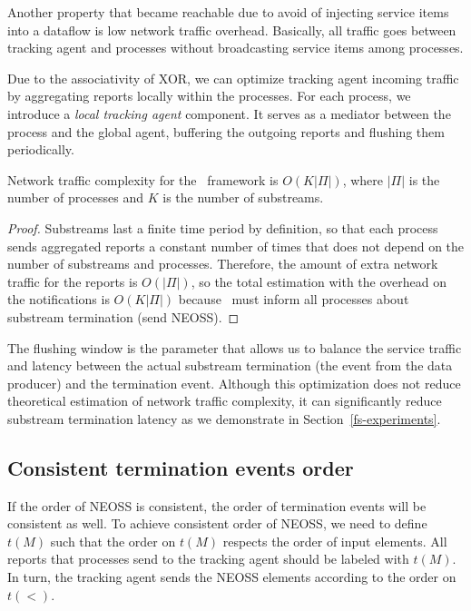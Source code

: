 Another property that became reachable due to avoid of injecting service items into a dataflow is low network traffic overhead. Basically, all traffic goes between tracking agent and processes without broadcasting service items among processes.

Due to the associativity of XOR, we can optimize tracking agent incoming traffic by aggregating reports locally within the processes. For each process, we introduce a {\em local tracking agent} component. It serves as a mediator between the process and the global agent, buffering the outgoing reports and flushing them periodically. 

\begin{lemma}
Network traffic complexity for the \tracker\ framework is $O(K|\Pi|)$, where $|\Pi|$ is the number of processes and $K$ is the number of substreams.
\end{lemma}
\begin{proof}
Substreams last a finite time period by definition, so that each process sends aggregated reports a constant number of times that does not depend on the number of substreams and processes. Therefore, the amount of extra network traffic for the reports is $O(|\Pi|)$, so the total estimation with the overhead on the notifications is $O(K|\Pi|)$ because \tracker\ must inform all processes about substream termination (send NEOSS).
\end{proof}

The flushing window is the parameter that allows us to balance the service traffic and latency between the actual substream termination (the event from the data producer) and the termination event. Although this optimization does not reduce theoretical estimation of network traffic complexity, it can significantly reduce substream termination latency as we demonstrate in Section~\ref{fs-experiments}.

\subsection{Consistent termination events order}

If the order of NEOSS is consistent, the order of termination events will be consistent as well. To achieve consistent order of NEOSS, we need to define $t(M)$ such that the order on $t(M)$ respects the order of input elements. All reports that processes send to the tracking agent should be labeled with $t(M)$. In turn, the tracking agent sends the NEOSS elements according to the order on $t(<)$.

